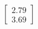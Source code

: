 \documentclass[preview]{standalone}
\begin{document}
\begin{align*}
\begin{bmatrix} 2.79 \\ 3.69 \end{bmatrix}
\end{align*}
\end{document}

